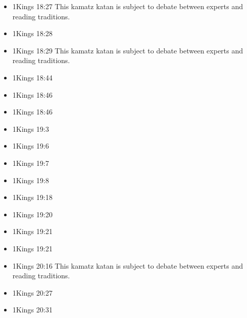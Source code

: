 \documentclass[14pt]{book}
\begin{document}
\begin{multicols}{2}
\begin{itemize}
											\item 1Kings 18:27 This kamatz katan is subject to debate between experts and reading traditions.
											
											\item 1Kings 18:28
											
											\item 1Kings 18:29 This kamatz katan is subject to debate between experts and reading traditions.
											
											\item 1Kings 18:44
											
											\item 1Kings 18:46
											
											\item 1Kings 18:46
											
											\item 1Kings 19:3
											
											\item 1Kings 19:6
											
											\item 1Kings 19:7
											
											\item 1Kings 19:8
											
											\item 1Kings 19:18
											
											\item 1Kings 19:20
											
											\item 1Kings 19:21
											
											\item 1Kings 19:21
											
											\item 1Kings 20:16 This kamatz katan is subject to debate between experts and reading traditions.
											
											\item 1Kings 20:27
											
											\item 1Kings 20:31
											

\end{itemize}
\end{multicols}
\end{document}

